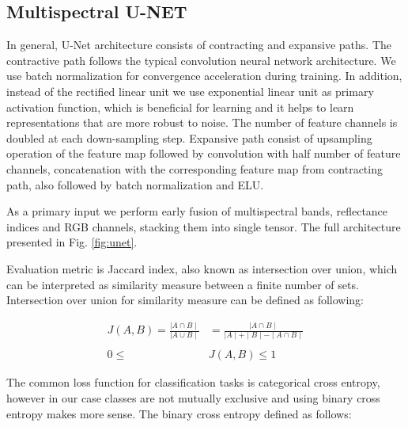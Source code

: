 \documentclass[10pt,twocolumn,letterpaper]{article}
\begin{document}
\subsection{Multispectral U-NET}

In general, U-Net architecture consists of contracting and expansive paths. The contractive path follows the typical convolution neural network architecture.
We use batch normalization \cite{batchnorm} for convergence acceleration during training. In addition, instead of the rectified linear unit we use exponential linear \cite{elu} unit as primary activation function, which is beneficial for learning and it helps to learn representations that are more robust to noise. The number of feature channels is doubled at each down-sampling step. Expansive path consist of upsampling operation of the feature map followed by convolution with half number of feature channels, concatenation with the corresponding feature map from contracting path, also followed by batch normalization and ELU. 

As a primary input we perform early fusion of multispectral bands, reflectance indices and RGB channels, stacking them into single tensor. The full architecture presented in Fig. \ref{fig:unet}.



Evaluation metric is Jaccard index, also known as intersection over union, which can be interpreted as similarity  measure between a finite number of sets. Intersection over union for similarity measure can be defined as following: 
 
\begin{equation}
\begin{aligned}
J(A, B) = \frac{\mid A \cap B \mid }{\mid A \cup B \mid} &= \frac{\mid A \cap B \mid}{\mid A \mid + \mid B \mid - \mid A \cap B \mid} \\ \\ 
0 \le & J(A, B) \le 1
\end{aligned}
\end{equation}

The common loss function for classification tasks is categorical cross entropy, however in our case classes are not mutually exclusive and using binary cross entropy makes more sense. The binary cross entropy defined as follows:
 
\end{document}
